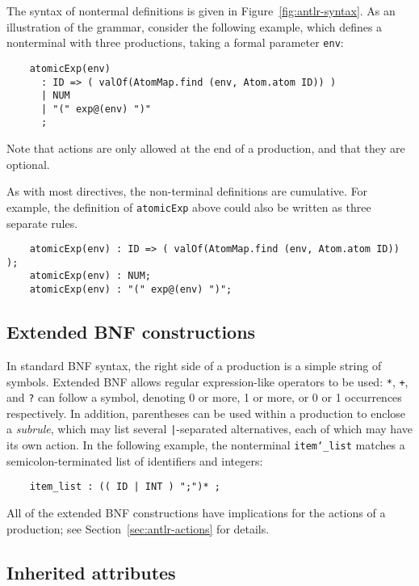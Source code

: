 The syntax of nontermal definitions is given in Figure~\ref{fig:antlr-syntax}.  As an illustration of the grammar, consider the following example, which defines a nonterminal with three productions, taking a formal parameter \texttt{env}:
\begin{verbatim}
    atomicExp(env)
      : ID => ( valOf(AtomMap.find (env, Atom.atom ID)) )
      | NUM
      | "(" exp@(env) ")"
      ;
\end{verbatim}
Note that actions are only allowed at the end of a production, and that they are optional.

As with most directives, the non-terminal definitions are cumulative.
For example, the definition of \texttt{atomicExp} above could also be
written as three separate rules.
\begin{verbatim}
    atomicExp(env) : ID => ( valOf(AtomMap.find (env, Atom.atom ID)) );
    atomicExp(env) : NUM;
    atomicExp(env) : "(" exp@(env) ")";
\end{verbatim}

\subsection{Extended BNF constructions}

In standard BNF syntax, the right side of a production is a simple string of symbols.  Extended BNF allows regular expression-like operators to be used: \texttt{*}, \texttt{+}, and \texttt{?} can follow a symbol, denoting 0 or more, 1 or more, or 0 or 1 occurrences respectively.  In addition, parentheses can be used within a production to enclose a \emph{subrule}, which may list several \texttt{|}-separated alternatives, each of which may have its own action.  In the following example, the nonterminal \texttt{item\char`\_list} matches a semicolon-terminated list of identifiers and integers:
\begin{verbatim}
    item_list : (( ID | INT ) ";")* ;
\end{verbatim}
All of the extended BNF constructions have implications for the actions of a production; see Section~\ref{sec:antlr-actions} for details.

\subsection{Inherited attributes}\label{sec:inh-attr}

